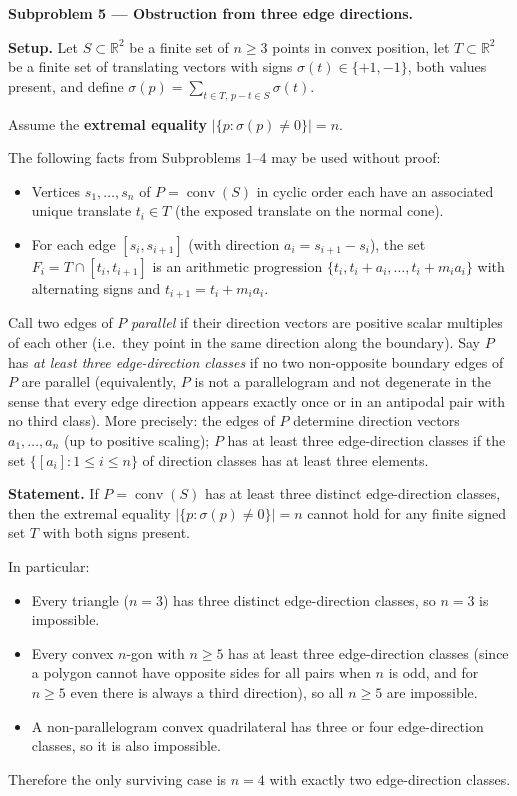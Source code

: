 \documentclass{article}
\begin{document}
\textbf{Subproblem 5 --- Obstruction from three edge directions.}

\medskip
\textbf{Setup.}
Let $S\subset\mathbb{R}^2$ be a finite set of $n\ge 3$ points in convex position,
let $T\subset\mathbb{R}^2$ be a finite set of translating vectors with signs
$\sigma(t)\in\{+1,-1\}$, both values present, and define
$\sigma(p)=\sum_{t\in T,\,p-t\in S}\sigma(t)$.

Assume the \textbf{extremal equality} $|\{p:\sigma(p)\neq 0\}|=n$.

The following facts from Subproblems 1--4 may be used without proof:
\begin{itemize}
  \item Vertices $s_1,\dots,s_n$ of $P=\operatorname{conv}(S)$ in cyclic order each have
        an associated unique translate $t_i\in T$ (the exposed translate on the normal cone).
  \item For each edge $[s_i,s_{i+1}]$ (with direction $a_i=s_{i+1}-s_i$), the set
        $F_i=T\cap[t_i,t_{i+1}]$ is an arithmetic progression
        $\{t_i,t_i+a_i,\dots,t_i+m_i a_i\}$ with alternating signs and $t_{i+1}=t_i+m_i a_i$.
\end{itemize}

Call two edges of $P$ \emph{parallel} if their direction vectors are positive scalar multiples
of each other (i.e.\ they point in the same direction along the boundary).  Say $P$ has
\emph{at least three edge-direction classes} if no two non-opposite boundary edges of $P$
are parallel (equivalently, $P$ is not a parallelogram and not degenerate in the sense
that every edge direction appears exactly once or in an antipodal pair with no third class).
More precisely: the edges of $P$ determine direction vectors $a_1,\dots,a_n$ (up to positive
scaling); $P$ has at least three edge-direction classes if the set
$\{[a_i]:1\le i\le n\}$ of direction classes has at least three elements.

\medskip
\textbf{Statement.}
If $P=\operatorname{conv}(S)$ has at least three distinct edge-direction classes, then
the extremal equality $|\{p:\sigma(p)\neq 0\}|=n$ cannot hold for any finite signed set $T$
with both signs present.

In particular:
\begin{itemize}
  \item Every triangle ($n=3$) has three distinct edge-direction classes, so $n=3$ is impossible.
  \item Every convex $n$-gon with $n\ge 5$ has at least three edge-direction classes
        (since a polygon cannot have opposite sides for all pairs when $n$ is odd, and for
        $n\ge 5$ even there is always a third direction), so all $n\ge 5$ are impossible.
  \item A non-parallelogram convex quadrilateral has three or four edge-direction classes,
        so it is also impossible.
\end{itemize}
Therefore the only surviving case is $n=4$ with exactly two edge-direction classes.
\end{document}
